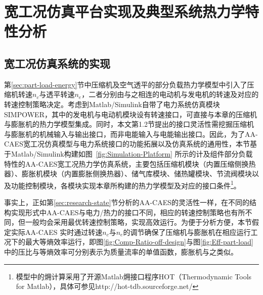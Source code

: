 

\section{宽工况仿真平台实现及典型系统热力学特性分析}
\label{sec:chap2-bound-measure}

\subsection{宽工况仿真系统的实现}
第\ref{sec:part-load-energy}节中压缩机及空气透平的部分负载热力学模型中引入了压缩机转速$n_c$与透平转速$n_e$，二者分别由与之相连的电动机与发电机的转速及对应的转速控制策略决定。考虑到Matlab/Simulink自带了电力系统仿真模块SIMPOWER，其中的发电机与电动机模块设有转速接口，可直接与本章的压缩机与膨胀机的热力学模型集成。同时，本文第1.2节提出的接口灵活性需挖掘压缩机与膨胀机的机械输入与输出接口，而非电能输入与电能输出接口。因此，为了AA-CAES宽工况仿真模型与电力系统接口的功能拓展以及仿真系统的通用性，本节基于Matlab/Simulink构建如图~\ref{fig:Simulation-Platform} 所示的计及组件部分负载特性的AA-CAES宽工况热力学仿真系统，主要包括压缩机模块（内置压缩侧换热器）、膨胀机模块（内置膨胀侧换热器）、储气库模块、储热罐模块、节流阀模块以及功能控制模块，各模块实现本章所构建的热力学模型及对应的接口条件\footnote{模型中的㶲计算采用了开源Matlab㶲接口程序HOT（Thermodynamic Tools for Matlab），具体可参见http://hot-tdb.sourceforge.net/}。

事实上，正如第\ref{sec:research-state}节分析的AA-CAES的灵活性一样，在不同的结构实现形式中AA-CAES与电力/热力的接口不同，相应的转速控制策略也有所不同，但一般均会采用最优转速控制策略，实现高效运行。为便于分析方便，本节假定实际AA-CAES 实时通过转速$n_c$与$n_e$的调节确保了压缩机与膨胀机在相应运行工况下的最大等熵效率运行，即图\ref{fig:Comp-Ratio-off-design}与图\ref{fig:Eff-part-load} 中的压比与等熵效率可分别表示为质量流率的单值函数，膨胀机与之类似。


